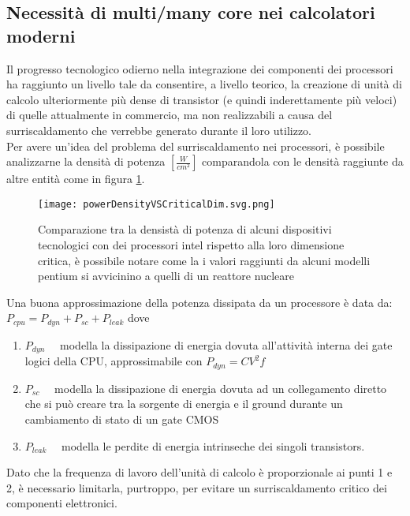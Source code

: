 \subsection{Necessità di multi/many core nei calcolatori moderni}
Il progresso tecnologico odierno nella integrazione dei componenti dei processori
ha raggiunto un livello tale da consentire, a livello teorico, la creazione di unità di calcolo 
ulteriormente più dense di transistor (e quindi inderettamente più veloci) di quelle attualmente in commercio,
ma non realizzabili a causa del surriscaldamento che verrebbe generato durante il loro utilizzo.\\
Per avere un'idea del problema del surriscaldamento nei processori,
è possibile analizzarne la densità di potenza $\left[\frac{W}{cm^2}\right]$
comparandola con le densità raggiunte da altre entità come in figura \ref{fig:powerDensityVSCriticalDim}.
\begin{figure}[H]
  \centering \texttt{[image: powerDensityVSCriticalDim.svg.png]}
  \caption[densità di potenza CPU vs dimensione critica]{Comparazione tra la densistà di potenza di alcuni dispositivi tecnologici con dei processori intel rispetto alla loro dimensione critica,
			è possibile notare come la i valori raggiunti da alcuni modelli pentium si avvicinino a quelli di un reattore nucleare}
  \decoRule \label{fig:powerDensityVSCriticalDim}
\end{figure}
\voidLine
Una buona approssimazione della potenza dissipata da un processore è data da:
$P_{cpu} =  P_{dyn} + P_{sc} + P_{leak}$ dove 
\begin{enumerate}
	\item $P_{dyn}\quad$ modella la dissipazione di energia dovuta all'attività interna dei gate logici della CPU,
	approssimabile con $P_{dyn} = CV^2 f$
	\item $P_{sc}\quad$	 modella la dissipazione di energia 
	dovuta ad un collegamento diretto che si può creare tra la sorgente di energia e il ground durante
	un cambiamento di stato di un gate CMOS
	\item $P_{leak}\quad$ modella le perdite di energia intrinseche dei singoli transistors.
\end{enumerate}
Dato che la frequenza di lavoro dell'unità di calcolo è proporzionale ai punti 1 e 2,
è necessario limitarla, purtroppo, per evitare un surriscaldamento critico dei componenti elettronici.\\
